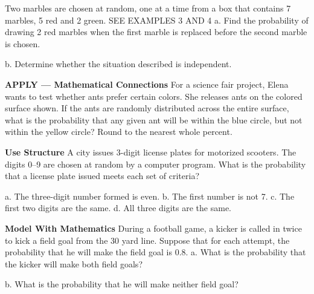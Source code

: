 \documentclass{article}
\newenvironment{practice}[2]{}{}        %
\newcommand{\answer}[1]{}               %
\newcommand{\placeholder}[2]{}          %
\newcommand{\te}[1]{}                   %
\begin{document}
\begin{practice}{21}{1}
Two marbles are chosen at random, one at a time from a box that contains 7 marbles, 5 red and 2 green. SEE EXAMPLES 3 AND 4
a. Find the probability of drawing 2 red marbles when the first marble is replaced before the second marble is chosen.
\answer{a. (\frac{25}{49})}
b. Determine whether the situation described is independent.
\answer{b. independent}
\end{practice}
\begin{practice}{22}{2}
\textbf{APPLY — Mathematical Connections} For a science fair project, Elena wants to test whether ants prefer certain colors. She releases ants on the colored surface shown. If the ants are randomly distributed across the entire surface, what is the probability that any given ant will be within the blue circle, but not within the yellow circle? Round to the nearest whole percent.
\placeholder{diagram}{Three concentric circles, common black center. Yellow disk Y radius 3 in.; blue surrounding disk B radius 9 in.; white outer disk W radius 15 in. Red radii: horizontal right to yellow boundary, diagonal upper right to blue boundary, vertical up to outer boundary, each labeled with its length.}
\answer{32\%}
\end{practice}
\begin{practice}{23}{2}
\textbf{Use Structure} A city issues 3-digit license plates for motorized scooters. The digits 0--9 are chosen at random by a computer program. What is the probability that a license plate issued meets each set of criteria?
\placeholder{illustration}{Rear view of green motor scooter on street, orange license plate showing three question marks.}
a. The three-digit number formed is even. \answer{a. (\frac12)}
b. The first number is not 7. \answer{b. (\frac19)}
c. The first two digits are the same. \answer{c. (\frac1{10})}
d. All three digits are the same. \answer{d. (\frac1{100})}
\te{Printed answer b is 1/9; likely 9/10 for a randomly chosen digit from 0 through 9.}
\end{practice}
\begin{practice}{24}{2}
\textbf{Model With Mathematics} During a football game, a kicker is called in twice to kick a field goal from the 30 yard line. Suppose that for each attempt, the probability that he will make the field goal is 0.8.
a. What is the probability that the kicker will make both field goals?
\answer{a. 0.64, or 64\%}
b. What is the probability that he will make neither field goal?
\answer{b. 0.04, or 4\%}
\end{practice}
\end{document}
